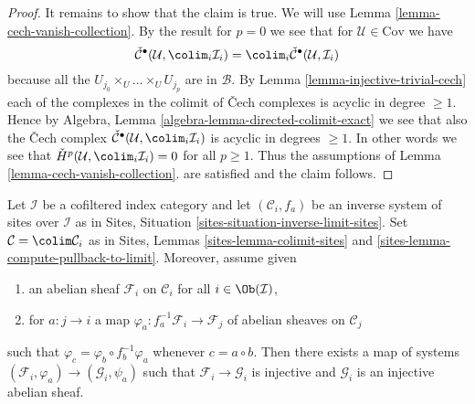 \begin{proof}
\medskip\noindent
It remains to show that the claim is true. We will use
Lemma \ref{lemma-cech-vanish-collection}.
By the result for $p = 0$ we see that for $\mathcal{U} \in \text{Cov}$
we have
$$
\check{\mathcal{C}}^\bullet(\mathcal{U}, \colim_i \mathcal{I}_i)
=
\colim_i \check{\mathcal{C}}^\bullet(\mathcal{U}, \mathcal{I}_i)
$$
because all the $U_{j_0} \times_U \ldots \times_U U_{j_p}$
are in $\mathcal{B}$. By
Lemma \ref{lemma-injective-trivial-cech}
each of the complexes in the colimit of {\v C}ech complexes is
acyclic in degree $\geq 1$. Hence by
Algebra, Lemma \ref{algebra-lemma-directed-colimit-exact}
we see that also the {\v C}ech complex
$\check{\mathcal{C}}^\bullet(\mathcal{U}, \colim_i \mathcal{I}_i)$
is acyclic in degrees $\geq 1$. In other words we see that
$\check{H}^p(\mathcal{U}, \colim_i \mathcal{I}_i) = 0$
for all $p \geq 1$. Thus the assumptions of
Lemma \ref{lemma-cech-vanish-collection}.
are satisfied and the claim follows.
\end{proof}

\begin{lemma}
\label{lemma-colim-sites-injective}
Let $\mathcal{I}$ be a cofiltered index category and let
$(\mathcal{C}_i, f_a)$ be an inverse system of sites over $\mathcal{I}$
as in Sites, Situation \ref{sites-situation-inverse-limit-sites}.
Set $\mathcal{C} = \colim \mathcal{C}_i$ as in Sites,
Lemmas \ref{sites-lemma-colimit-sites} and
\ref{sites-lemma-compute-pullback-to-limit}.
Moreover, assume given
\begin{enumerate}
\item an abelian sheaf $\mathcal{F}_i$ on $\mathcal{C}_i$ for all
$i \in \Ob(\mathcal{I})$,
\item for $a : j \to i$ a map
$\varphi_a : f_a^{-1}\mathcal{F}_i \to \mathcal{F}_j$
of abelian sheaves on $\mathcal{C}_j$
\end{enumerate}
such that $\varphi_c = \varphi_b \circ f_b^{-1}\varphi_a$
whenever $c = a \circ b$. Then there exists a map of systems
$(\mathcal{F}_i, \varphi_a) \to (\mathcal{G}_i, \psi_a)$
such that $\mathcal{F}_i \to \mathcal{G}_i$ is injective and
$\mathcal{G}_i$ is an injective abelian sheaf.
\end{lemma}

